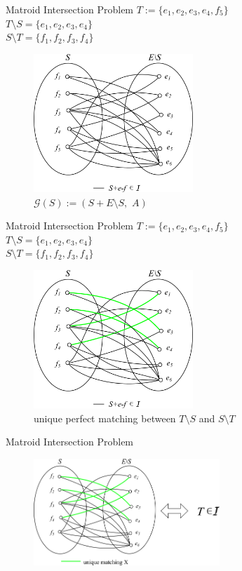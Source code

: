\documentclass[11pt,xcolor=dvipsnames,table,dvipdfmx]{beamer}
\begin{document}
\begin{frame}{Matroid Intersection Problem}
 \centering
 \vspace{0.2cm}
 $T := \{e_1, e_2, e_3, e_4, f_5\}$\\
 $T \setminus S = \{e_1, e_2, e_3, e_4\}$\\
 $S \setminus T = \{f_1, f_2, f_3, f_4\}$
 \begin{figure}
  \caption{$\mathcal{G}(S) := (S+E \setminus S,\,\, A)$}
  \centering
  \includegraphics[width=6cm]{matching3.png}\vspace{0.2cm}
 \end{figure}
\end{frame}

\begin{frame}{Matroid Intersection Problem}
 \centering
 \vspace{0.2cm}
 $T := \{e_1, e_2, e_3, e_4, f_5\}$\\
 $T \setminus S = \{e_1, e_2, e_3, e_4\}$\\
 $S \setminus T = \{f_1, f_2, f_3, f_4\}$
 \begin{figure}
  \caption{unique perfect matching between $T \setminus S$ and $S \setminus T$}
  \centering
  \includegraphics[width=6cm]{matching4.png}\vspace{0.2cm}
 \end{figure}
\end{frame}

\begin{frame}{Matroid Intersection Problem}
 \begin{figure}
  \centering
  \includegraphics[width=7cm]{matching5.png}\vspace{0.2cm}
 \end{figure}
\end{frame}
\end{document}
